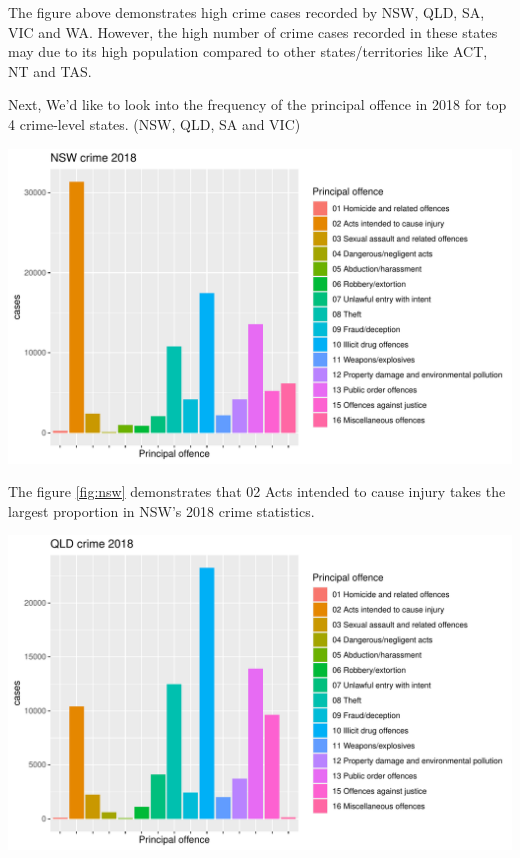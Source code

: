 \documentclass[11pt,a4paper,]{article}
\let\origfigure\figure
\let\endorigfigure\endfigure
\renewenvironment{figure}[1][2] {
\expandafter\origfigure\expandafter[H]
} {
\endorigfigure
}
\begin{document}
The figure above demonstrates high crime cases recorded by NSW, QLD, SA, VIC and WA. However, the high number of crime cases recorded in these states may due to its high population compared to other states/territories like ACT, NT and TAS.

Next, We'd like to look into the frequency of the principal offence in 2018 for top 4 crime-level states. (NSW, QLD, SA and VIC)

\begin{figure}
\centering
\includegraphics{ETC5513-Assignment4_files/figure-latex/nsw-1.pdf}
\caption{\label{fig:nsw}NSW crime 2018}
\end{figure}

The figure \ref{fig:nsw} demonstrates that 02 Acts intended to cause injury takes the largest proportion in NSW's 2018 crime statistics.

\begin{figure}
\centering
\includegraphics{ETC5513-Assignment4_files/figure-latex/qld-1.pdf}
\caption{\label{fig:qld}QLD crime 2018}
\end{figure}
\end{document}

